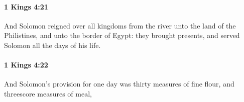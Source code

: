 		\paragraph{1 Kings 4:21} %
			\label{1KINGS-4-21}

			And Solomon reigned over all kingdoms from the river unto the land of the Philistines, and unto the border of Egypt: they brought presents, and served Solomon all the days of his life.


		\paragraph{1 Kings 4:22} %
			\label{1KINGS-4-22}

			And Solomon’s provision for one day was thirty measures of fine flour, and threescore measures of meal,


